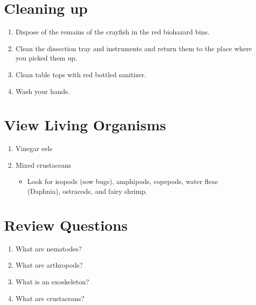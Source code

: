 \section{Cleaning up}\label{cleaning-up-2}

\begin{enumerate}
\def\labelenumi{\arabic{enumi}.}
\tightlist
\item
  Dispose of the remains of the crayfish in the red biohazard bins.
\item
  Clean the dissection tray and instruments and return them to the place
  where you picked them up.
\item
  Clean table tops with red bottled sanitizer.
\item
  Wash your hands.
\end{enumerate}

\section{View Living Organisms}\label{view-living-organisms-4}

\begin{enumerate}
\def\labelenumi{\arabic{enumi}.}
\tightlist
\item
  Vinegar eels
\item
  Mixed crustaceans

  \begin{itemize}
  \tightlist
  \item
    Look for isopods (sow bugs), amphipods, copepods, water fleas
    (Daphnia), ostracods, and fairy shrimp.
  \end{itemize}
\end{enumerate}

\section{Review Questions}\label{review-questions-5}

\begin{enumerate}
\def\labelenumi{\arabic{enumi}.}
\tightlist
\item
  What are nematodes?
\item
  What are arthropods?
\item
  What is an exoskeleton?
\item
  What are crustaceans?
\end{enumerate}
